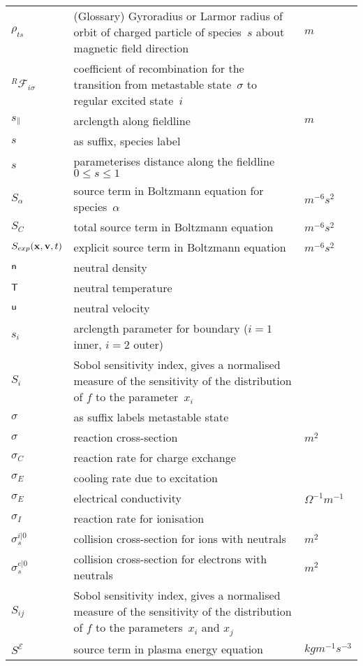 \begin{longtable}{|p{3.0cm}|p{10.0cm}|p{3.0cm}|}
$\rho_{ts}$  & (Glossary) Gyroradius or Larmor radius of orbit of charged particle of species~$s$ about magnetic field direction  & $m$ \\
$^R\mathcal{F}_{i\sigma}$ & coefficient of recombination for the transition from metastable state~$\sigma$ to regular excited state~$i$  & \\
$s_{\|}$ & arclength along fieldline  & $m$ \\
$s$ & as suffix, species label & \\
$s$ & parameterises distance along the fieldline $0\leq s \leq 1$ & \\
$S_\alpha$ & source term in Boltzmann equation for species~$\alpha$  & $m^{-6} s^2$ \\
$S_C$ & total source term in Boltzmann equation  & $m^{-6} s^2$ \\
$S_{exp}({\bf x}, {\bf v},t)$ & explicit source term in Boltzmann equation  & $m^{-6} s^2$ \\
${\sf n}$ & neutral density  & \\
${\sf T}$ & neutral temperature  & \\
${\sf u}$ & neutral velocity  & \\
$s_i$ & arclength parameter for boundary ($i=1$ inner, $i=2$ outer) & \\
$S_i$ & Sobol sensitivity index, gives a normalised measure of the sensitivity of the distribution of $f$ to the parameter~$x_i$  & \\
$\sigma$ & as suffix labels metastable state & \\
$\sigma$ & reaction cross-section  & $m^2$ \\
$\sigma_C$ & reaction rate for charge exchange  & \\
$\sigma_E$ & cooling rate due to excitation  & \\
$\sigma_E$ & electrical conductivity  & $\Omega^{-1} m^{-1}$ \\
$\sigma_I$ & reaction rate for ionisation  & \\
$\sigma_s^{i|0}$ & collision cross-section for ions with neutrals  & $m^2$ \\
$\sigma_s^{e|0}$ & collision cross-section for electrons with neutrals  & $m^2$ \\
$S_{ij}$ & Sobol sensitivity index, gives a normalised measure of the sensitivity of the distribution of $f$ to the parameters~$x_i$ and $x_j$  & \\
$S^\mathcal{E}$ & source term in plasma energy equation  & $kg m^{-1} s^{-3}$ \\

\end{longtable}
